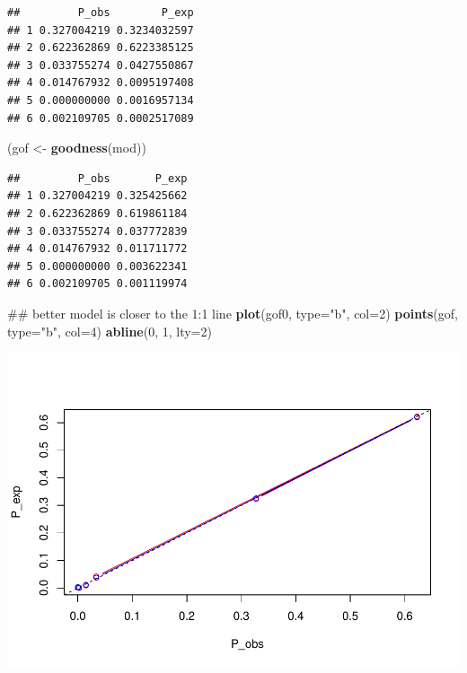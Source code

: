 \documentclass[]{article}
\newenvironment{Shaded}{\begin{snugshade}}{\end{snugshade}}
\newcommand{\KeywordTok}[1]{\textcolor[rgb]{0.13,0.29,0.53}{\textbf{#1}}}
\newcommand{\DataTypeTok}[1]{\textcolor[rgb]{0.13,0.29,0.53}{#1}}
\newcommand{\DecValTok}[1]{\textcolor[rgb]{0.00,0.00,0.81}{#1}}
\newcommand{\StringTok}[1]{\textcolor[rgb]{0.31,0.60,0.02}{#1}}
\newcommand{\NormalTok}[1]{#1}
\begin{document}
\begin{verbatim}
##         P_obs        P_exp
## 1 0.327004219 0.3234032597
## 2 0.622362869 0.6223385125
## 3 0.033755274 0.0427550867
## 4 0.014767932 0.0095197408
## 5 0.000000000 0.0016957134
## 6 0.002109705 0.0002517089
\end{verbatim}

\begin{Shaded}
\begin{Highlighting}[]
\NormalTok{(gof <-}\StringTok{ }\KeywordTok{goodness}\NormalTok{(mod))}
\end{Highlighting}
\end{Shaded}

\begin{verbatim}
##         P_obs       P_exp
## 1 0.327004219 0.325425662
## 2 0.622362869 0.619861184
## 3 0.033755274 0.037772839
## 4 0.014767932 0.011711772
## 5 0.000000000 0.003622341
## 6 0.002109705 0.001119974
\end{verbatim}

\begin{Shaded}
\begin{Highlighting}[]
\NormalTok{## better model is closer to the 1:1 line}
\KeywordTok{plot}\NormalTok{(gof0, }\DataTypeTok{type=}\StringTok{"b"}\NormalTok{, }\DataTypeTok{col=}\DecValTok{2}\NormalTok{)}
\KeywordTok{points}\NormalTok{(gof, }\DataTypeTok{type=}\StringTok{"b"}\NormalTok{, }\DataTypeTok{col=}\DecValTok{4}\NormalTok{)}
\KeywordTok{abline}\NormalTok{(}\DecValTok{0}\NormalTok{, }\DecValTok{1}\NormalTok{, }\DataTypeTok{lty=}\DecValTok{2}\NormalTok{)}
\end{Highlighting}
\end{Shaded}

\includegraphics{Patagonia_parrots_density_analysis_files/figure-latex/unnamed-chunk-42-1.pdf}
\end{document}
